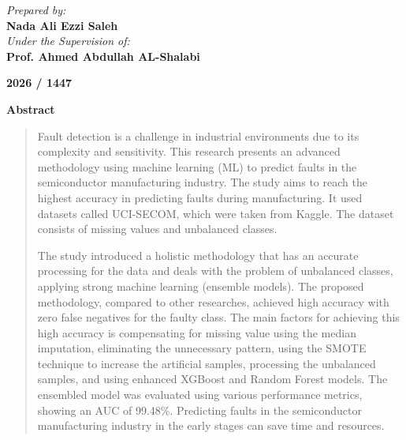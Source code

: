 \documentclass[12pt,oneside]{article}
\begin{document}
\begin{titlepage}
\begin{center}
        \vspace{1.0cm}
        \begin{minipage}{0.8\textwidth} \centering \textit{Prepared by:} \\ \vspace{0.2cm} {\large \textbf{Nada Ali Ezzi Saleh}} \\[1.2cm] \textit{Under the Supervision of:} \\ \vspace{0.2cm} {\large \textbf{Prof. Ahmed Abdullah AL-Shalabi}} \end{minipage}
        \vfill
        {\large \textbf{ 2026 /  1447}} \vspace{2.5cm}
    \end{center}
\end{titlepage}
\newpage
{}

\vspace*{1cm} 
\begin{center}
    {\huge \textbf{\textcolor[HTML]{8B0000}{Abstract}}} 
\end{center}

\vspace{0.5cm} 

\begin{quotation}
\noindent %
Fault detection is a challenge in industrial environments due to its complexity and sensitivity. This research presents an advanced methodology using machine learning (ML) to predict faults in the semiconductor manufacturing industry. The study aims to reach the highest accuracy in predicting faults during manufacturing. It used datasets called UCI-SECOM, which were taken from Kaggle. The dataset consists of missing values and unbalanced classes.

The study introduced a holistic methodology that has an accurate processing for the data and deals with the problem of unbalanced classes, applying strong machine learning (ensemble models). The proposed methodology, compared to other researches, achieved high accuracy with zero false negatives for the faulty class. The main factors for achieving this high accuracy is compensating for missing value using the median imputation, eliminating the unnecessary pattern, using the SMOTE technique to increase the artificial samples, processing the unbalanced samples, and using enhanced XGBoost and Random Forest models. The ensembled model was evaluated using various performance metrics, showing an AUC of 99.48\%. Predicting faults in the semiconductor manufacturing industry in the early stages can save time and resources.
\end{quotation}
\end{document}
